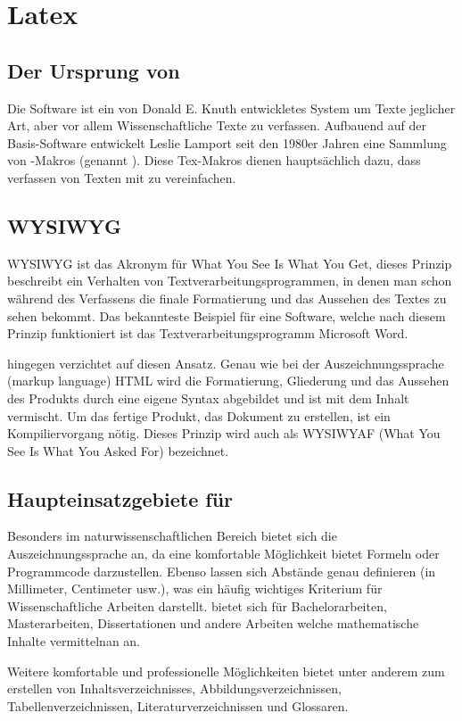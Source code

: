\chapter{Latex}
    \section{Der Ursprung von \latex}
    Die Software \tex ist ein von Donald E. Knuth entwickletes System um Texte jeglicher Art, aber vor allem Wissenschaftliche Texte zu verfassen. Aufbauend auf der Basis-Software \tex entwickelt Leslie Lamport seit den 1980er Jahren eine Sammlung von \tex-Makros (genannt \latex). Diese Tex-Makros dienen hauptsächlich dazu, dass verfassen von Texten mit \tex zu vereinfachen.

    \section{WYSIWYG}
    WYSIWYG ist das Akronym für What You See Is What You Get, dieses Prinzip beschreibt ein Verhalten von Textverarbeitungsprogrammen, in denen man schon während des Verfassens die finale Formatierung und das Aussehen des Textes zu sehen bekommt. Das bekannteste Beispiel für eine Software, welche nach diesem Prinzip funktioniert ist das Textverarbeitungsprogramm Microsoft Word.

    \tex hingegen verzichtet auf diesen Ansatz. Genau wie bei der Auszeichnungssprache (markup language) HTML wird die Formatierung, Gliederung und das Aussehen des Produkts durch eine eigene Syntax abgebildet und ist mit dem Inhalt vermischt. Um das fertige Produkt, das Dokument zu erstellen, ist ein Kompiliervorgang nötig. Dieses Prinzip wird auch als WYSIWYAF (What You See Is What You Asked For) bezeichnet.

    \section{Haupteinsatzgebiete für \tex}
    Besonders im naturwissenschaftlichen Bereich bietet sich die Auszeichnungssprache \tex an, da \tex eine komfortable Möglichkeit bietet Formeln oder Programmcode darzustellen. Ebenso lassen sich Abstände genau definieren (in Millimeter, Centimeter usw.), was ein häufig wichtiges Kriterium für Wissenschaftliche Arbeiten darstellt. \tex bietet sich für Bachelorarbeiten, Masterarbeiten, Dissertationen und andere Arbeiten welche mathematische Inhalte vermittelnan an.

    Weitere komfortable und professionelle Möglichkeiten bietet \tex unter anderem zum erstellen von Inhaltsverzeichnisses, Abbildungsverzeichnissen, Tabellenverzeichnissen, Literaturverzeichnissen und Glossaren.

